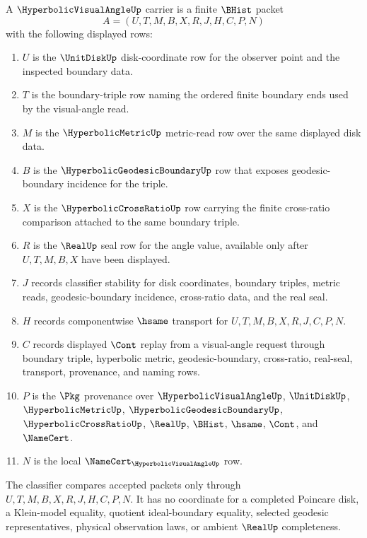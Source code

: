 \begin{definition}
\label{def:hyperbolic-visual-angle-carrier}
A $\HyperbolicVisualAngleUp$ carrier is a finite $\BHist$ packet
$$
A=(U,T,M,B,X,R,J,H,C,P,N)
$$
with the following displayed rows:
\begin{enumerate}
\item $U$ is the $\UnitDiskUp$ disk-coordinate row for the observer point and the inspected boundary data.
\item $T$ is the boundary-triple row naming the ordered finite boundary ends used by the visual-angle read.
\item $M$ is the $\HyperbolicMetricUp$ metric-read row over the same displayed disk data.
\item $B$ is the $\HyperbolicGeodesicBoundaryUp$ row that exposes geodesic-boundary incidence for the triple.
\item $X$ is the $\HyperbolicCrossRatioUp$ row carrying the finite cross-ratio comparison attached to the same boundary triple.
\item $R$ is the $\RealUp$ seal row for the angle value, available only after $U,T,M,B,X$ have been displayed.
\item $J$ records classifier stability for disk coordinates, boundary triples, metric reads, geodesic-boundary incidence, cross-ratio data, and the real seal.
\item $H$ records componentwise $\hsame$ transport for $U,T,M,B,X,R,J,C,P,N$.
\item $C$ records displayed $\Cont$ replay from a visual-angle request through boundary triple, hyperbolic metric, geodesic-boundary, cross-ratio, real-seal, transport, provenance, and naming rows.
\item $P$ is the $\Pkg$ provenance over $\HyperbolicVisualAngleUp$, $\UnitDiskUp$, $\HyperbolicMetricUp$, $\HyperbolicGeodesicBoundaryUp$, $\HyperbolicCrossRatioUp$, $\RealUp$, $\BHist$, $\hsame$, $\Cont$, and $\NameCert$.
\item $N$ is the local $\NameCert_{\HyperbolicVisualAngleUp}$ row.
\end{enumerate}
The classifier compares accepted packets only through $U,T,M,B,X,R,J,H,C,P,N$. It has no coordinate for a completed Poincare disk, a Klein-model equality, quotient ideal-boundary equality, selected geodesic representatives, physical observation laws, or ambient $\RealUp$ completeness.
\end{definition}

